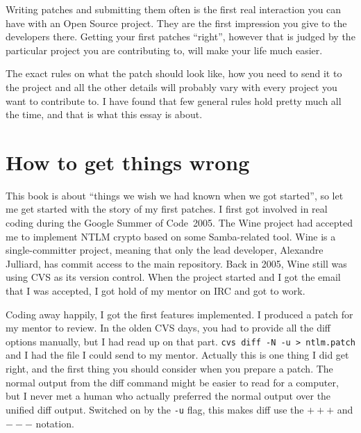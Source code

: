 

\noindent{}Writing patches and submitting them often is the first real interaction you can
have with an Open Source project. They are the first impression you give to the
developers there. Getting your first patches ``right'', however that is judged
by the particular project you are contributing to, will make your life much
easier.

The exact rules on what the patch should look like, how you need to send it to
the project and all the other details will probably vary with every project you
want to contribute to. I have found that few general rules hold pretty much all
the time, and that is what this essay is about.

\section*{How to get things wrong}

This book is about ``things we wish we had known when we got started'',
so let me get started with the story of my first patches. I first got involved
in real coding during the Google Summer of Code\texttrademark ~2005. The Wine
project had accepted me to implement NTLM crypto based on some Samba-related
tool. Wine is a single-committer project, meaning that only the lead developer,
Alexandre Julliard, has commit access to the main repository. Back in 2005, Wine
still was using CVS as its version control. When the project started and I got
the email that I was accepted, I got hold of my mentor on IRC and got to work.

Coding away happily, I got the first features implemented. I produced a patch
for my mentor to review. In the olden CVS days, you had to provide all the diff
options manually, but I had read up on that part.
\mbox{\texttt{cvs diff -N -u > ntlm.patch}} and I had the file I could send to
my mentor. Actually this is one thing I did get right, and the first thing you
should consider when you prepare a patch. The normal output from the diff
command might be easier to read for a computer, but I never met a human who
actually preferred the normal output over the unified diff output. Switched on
by the \texttt{-u} flag, this makes diff use the \texttt{$+++$} and
\texttt{$---$} notation.

